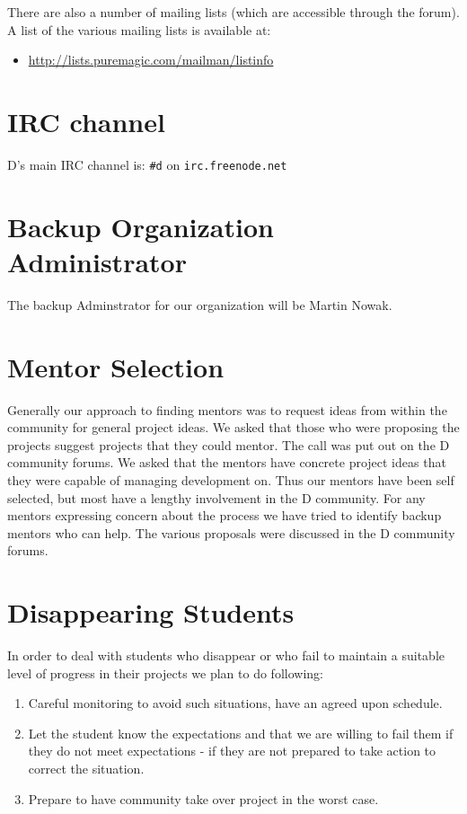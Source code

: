 \documentclass[	DIV=calc,%
							paper=a4,%
							fontsize=11pt,%
							twocolumn]{scrartcl}	 					%
\begin{document}
There are also a number of mailing lists (which are accessible 
through the forum).  A list of the various mailing lists is
available at:

\begin{itemize}
   \item \url{http://lists.puremagic.com/mailman/listinfo}
\end{itemize}

\section{IRC channel}
D's main IRC channel is:  \texttt{\#d} on \texttt{irc.freenode.net}

\section{Backup Organization Administrator}
The backup Adminstrator for our organization will be Martin Nowak.

\section{Mentor Selection}

Generally our approach to finding mentors was to request ideas
from within the community for general project ideas. We asked
that those who were proposing the projects suggest projects that
they could mentor. The call was put out on the D community forums.
We asked that the mentors have concrete project ideas that
they were capable of managing development on.  Thus our mentors
have been self selected, but most have a lengthy involvement 
in the D community. For any mentors expressing concern about the
process we have tried to identify backup mentors who can help. 
The various proposals were discussed in the D community forums. 

\section{Disappearing Students}
In order to deal with students who disappear or who fail to
maintain a suitable level of progress in their projects we plan
to do following:

\begin{enumerate}
\item Careful monitoring to avoid such situations, have an agreed upon
schedule.
\item Let the student know the expectations and that we are willing
to fail them if they do not meet expectations - if they are not prepared 
to take action to correct the situation.
\item Prepare to have community take over project in the worst case.
\end{enumerate}
\end{document}
